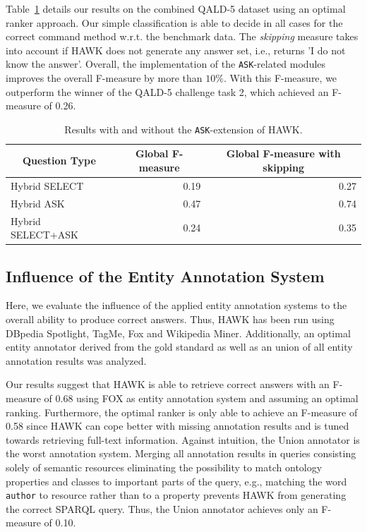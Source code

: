 Table~\ref{tab:eval_ask} details our results on the combined \ac{QALD}-5 dataset using an optimal ranker approach. 
Our simple classification is able to decide in all cases for the correct command method w.r.t. the benchmark data.
The \emph{skipping} measure takes into account if HAWK does not generate any answer set, i.e., returns 'I do not know the answer'.
Overall, the implementation of the \texttt{ASK}-related modules improves the overall F-measure by more than $10\%$. With this F-measure, we outperform the winner of the \ac{QALD}-5 challenge task 2, which achieved an F-measure of 0.26. 


\begin{table}[htb!]
\centering
\begin{tabular}{@{}lrr@{}}
\toprule
\multicolumn{1}{c}{{\bf Question Type}} & \multicolumn{1}{c}{{\bf Global F-measure}} & \multicolumn{1}{c}{{\bf Global F-measure with skipping}} \\ \midrule
Hybrid SELECT                           & 0.19                                       & 0.27                                                     \\
Hybrid ASK                              & 0.47                                       & 0.74                                                     \\
Hybrid SELECT+ASK                       & 0.24                                       & 0.35                                                     \\ \bottomrule
\end{tabular}
\caption{Results with and without the \texttt{ASK}-extension of HAWK.}
\label{tab:eval_ask}
\end{table}


\subsection{Influence of the Entity Annotation System}
Here, we evaluate the influence of the applied entity annotation systems to the overall ability to produce correct answers.
Thus, HAWK has been run using DBpedia Spotlight, TagMe, Fox and Wikipedia Miner. %
Additionally, an optimal entity annotator derived from the gold standard as well as an union of all entity annotation results was analyzed. 

Our results suggest that HAWK is able to retrieve correct answers with an F-measure of 0.68 using FOX as entity annotation system and assuming an optimal ranking.
Furthermore, the optimal ranker is only able to achieve an F-measure of 0.58 since HAWK can cope better with missing annotation results and is tuned towards retrieving full-text information.
Against intuition, the Union annotator is the worst annotation system. 
Merging all annotation results in queries consisting solely of semantic resources eliminating the possibility to match ontology properties and classes to important parts of the query, e.g., matching the word \texttt{author} to resource rather than to a property prevents HAWK from generating the correct SPARQL query.
Thus, the Union annotator achieves only an F-measure of 0.10.

